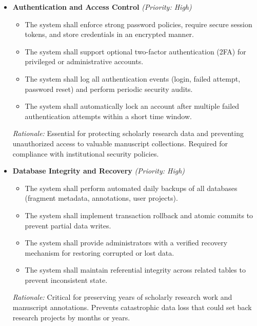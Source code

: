 \documentclass{article}
\begin{document}
\begin{itemize}
    \item \textbf{Authentication and Access Control} \textit{(Priority: High)}
    \begin{itemize}
        \item The system shall enforce strong password policies, require secure session tokens, and store credentials in an encrypted manner.
        \item The system shall support optional two-factor authentication (2FA) for privileged or administrative accounts.
        \item The system shall log all authentication events (login, failed attempt, password reset) and perform periodic security audits.
        \item The system shall automatically lock an account after multiple failed authentication attempts within a short time window.
    \end{itemize}
    \textit{Rationale:} Essential for protecting scholarly research data and preventing unauthorized access to valuable manuscript collections. Required for compliance with institutional security policies.

    \item \textbf{Database Integrity and Recovery} \textit{(Priority: High)}
    \begin{itemize}
        \item The system shall perform automated daily backups of all databases (fragment metadata, annotations, user projects).
        \item The system shall implement transaction rollback and atomic commits to prevent partial data writes.
        \item The system shall provide administrators with a verified recovery mechanism for restoring corrupted or lost data.
        \item The system shall maintain referential integrity across related tables to prevent inconsistent state.
    \end{itemize}
    \textit{Rationale:} Critical for preserving years of scholarly research work and manuscript annotations. Prevents catastrophic data loss that could set back research projects by months or years.


\end{itemize}
\end{document}
